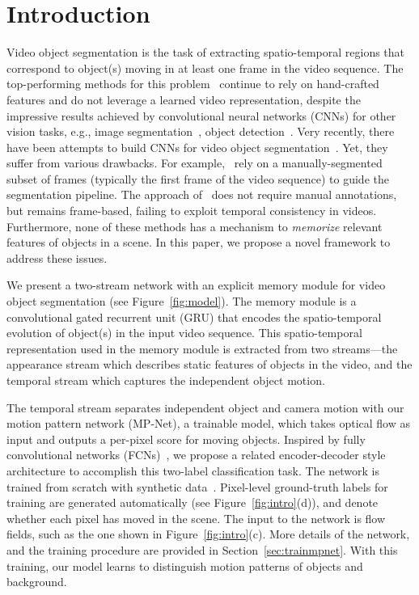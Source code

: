 \section{Introduction}
\label{intro}
Video object segmentation is the task of extracting spatio-temporal regions
that correspond to object(s) moving in at least one frame in the video
sequence. The top-performing methods for this
problem~\cite{papazoglou2013fast,Faktor14} continue to rely on hand-crafted
features and do not leverage a learned video representation, despite the
impressive results achieved by convolutional neural networks (CNNs) for other
vision tasks, e.g., image segmentation~\cite{pinheiro2016learning}, object
detection~\cite{ren2015faster}. Very recently, there have been attempts to
build CNNs for video object
segmentation~\cite{jain2017fusionseg,Caelles17,Khoreva16}. Yet, they suffer
from various drawbacks. For example,~\cite{Caelles17,Khoreva16} rely on a
manually-segmented subset of frames (typically the first frame of the video
sequence) to guide the segmentation pipeline. The approach
of~\cite{jain2017fusionseg} does not require manual annotations, but remains
frame-based, failing to exploit temporal consistency in videos. Furthermore,
none of these methods has a mechanism to {\it memorize} relevant features of
objects in a scene. In this paper, we propose a novel framework to address
these issues.

We present a two-stream network with an explicit memory module for video object
segmentation (see Figure~\ref{fig:model}). The memory module is a convolutional
gated recurrent unit (GRU) that encodes the spatio-temporal evolution of
object(s) in the input video sequence. This spatio-temporal representation used
in the memory module is extracted from two streams---the appearance stream
which describes static features of objects in the video, and the temporal
stream which captures the independent object motion.

The temporal stream separates independent object and camera motion with our
motion pattern network (MP-Net), a trainable model, which takes optical flow as
input and outputs a per-pixel score for moving objects. Inspired by fully
convolutional networks (FCNs)~\cite{long2015fully,Dosovitskiy15,Ronneberger15},
we propose a related encoder-decoder style architecture to accomplish this
two-label classification task. The network is trained from scratch with
synthetic data~\cite{Mayer16}.  Pixel-level ground-truth labels for training
are generated automatically (see Figure~\ref{fig:intro}(d)), and denote whether
each pixel has moved in the scene. The input to the network is flow fields,
such as the one shown in Figure~\ref{fig:intro}(c). More details of the
network, and the training procedure are provided in
Section~\ref{sec:trainmpnet}. With this training, our model learns to
distinguish motion patterns of objects and background.


